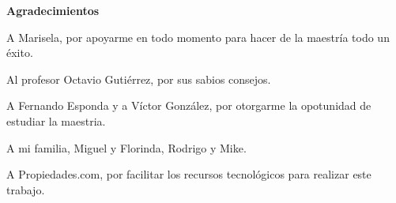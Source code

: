 \begin{center}
{\huge \bfseries Agradecimientos\\}
\end{center}


A Marisela, por apoyarme en todo momento para hacer de la maestr\'ia todo un \'exito.

Al profesor Octavio Gutiérrez, por sus sabios consejos.

A Fernando Esponda y a V\'ictor Gonz\'alez, por otorgarme la opotunidad de estudiar la maestria.

A mi familia, Miguel y Florinda, Rodrigo y Mike.

A Propiedades.com, por facilitar los recursos tecnol\'ogicos para realizar este trabajo.
